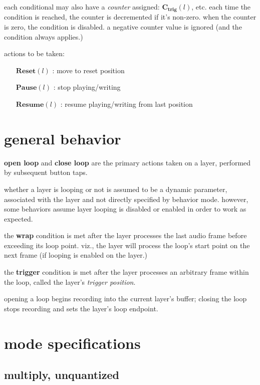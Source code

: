 \documentclass{article}
\begin{document}
each conditional may also have a \textit{counter} assigned: $\mathbf{C_{trig}}(l)$, etc. each time the condition is reached, the counter is decremented if it's non-zero. when the counter is zero, the condition is disabled. a negative counter value is ignored (and the condition always applies.)

actions to be taken:

\begin{itemize}%
\item[$\mathbf{Reset}(l)$]: move to reset position
\item[$\mathbf{Pause}(l)$]: stop playing/writing
\item[$\mathbf{Resume}(l)$]: resume playing/writing from last position
\end{itemize}

\section[general]{general behavior}

\textbf{open loop} and \textbf{close loop} are the primary actions taken on a layer, performed by subsequent button taps. 

whether a layer is looping or not is assumed to be a dynamic parameter, associated with the layer and not directly specified by behavior mode. however, some behaviors assume layer looping is disabled or enabled in order to work as expected.

the \textbf{wrap} condition is met after the layer processes the last audio frame before exceeding its loop point. viz., the layer will process the loop's start point on the next frame (if looping is enabled on the layer.) 

the \textbf{trigger} condition is met after the layer processes an arbitrary frame within the loop, called the layer's \textit{trigger position}.

opening a loop begins recording into the current layer's buffer; closing the loop stops recording and sets the layer's loop endpoint.

\section[modes]{mode specifications}

\subsection[mul-unquant]{multiply, unquantized}
\end{document}
